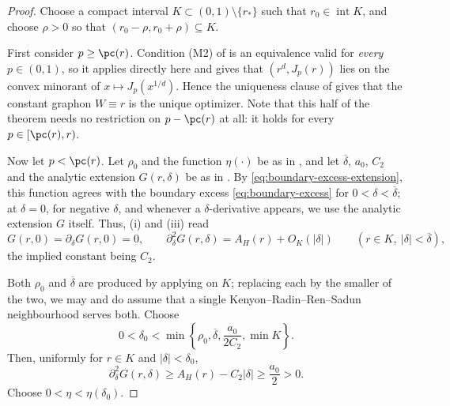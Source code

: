 \begin{proof}
Choose a compact interval \(K\subset(0,1)\setminus\{r_*\}\) such that
\(r_0\in\operatorname{int}K\), and choose \(\rho>0\) so that
\((r_0-\rho,r_0+\rho)\subseteq K\).

First consider $p\ge\pc(r)$.
Condition (M2) of  is an equivalence valid for
\emph{every} $p\in(0,1)$, so it applies directly here and gives that
$(r^d,J_p(r))$ lies on the convex minorant of $x\mapsto J_p(x^{1/d})$.  Hence
the uniqueness clause of  gives that the
constant graphon $W\equiv r$ is the unique optimizer.  Note that this half of
the theorem needs no restriction on $p-\pc(r)$ at all: it holds for every
$p\in[\pc(r),r)$.

Now let $p<\pc(r)$.
Let $\rho_0$ and the function $\eta(\cdot)$ be as in
, and let $\overline\delta$, $a_0$, $C_2$
and the analytic extension $G(r,\delta)$ be as in
.  By \eqref{eq:boundary-excess-extension}, this function agrees
with the boundary excess \eqref{eq:boundary-excess} for
$0<\delta<\overline\delta$; at $\delta=0$, for negative $\delta$, and whenever
a $\delta$-derivative appears, we use the analytic extension $G$ itself.
Thus, (i) and (iii) read
\[
  G(r,0)=\partial_\delta G(r,0)=0,
  \qquad
  \partial_\delta^2G(r,\delta)=A_H(r)+O_K(|\delta|)
  \qquad
  (r\in K,\ |\delta|<\overline\delta),
\]
the implied constant being $C_2$.

Both $\rho_0$ and $\overline\delta$ are produced by applying  on
$K$; replacing each by the smaller of the two, we may and do assume that a
single Kenyon--Radin--Ren--Sadun neighbourhood serves both.  Choose
\[
  0<\delta_0<
  \min\left\{\rho_0,\overline\delta,\frac{a_0}{2C_2},\min K\right\}.
\]
Then, uniformly for \(r\in K\) and \(|\delta|<\delta_0\),
\[
  \partial_\delta^2G(r,\delta)\ge A_H(r)-C_2|\delta|
  \ge \frac{a_0}{2}>0.
\]
Choose $0<\eta<\eta(\delta_0)$.


\end{proof}
